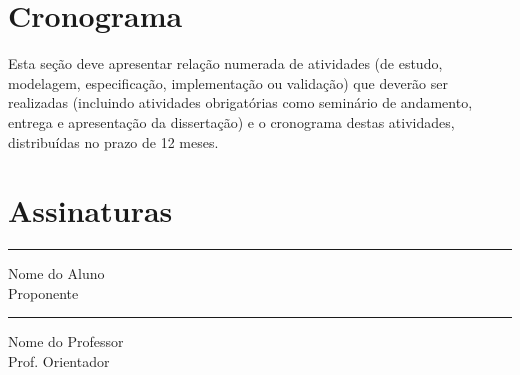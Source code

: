 \documentclass[diss-proposta,nocipinfo]{texufpel}
\begin{document}
\chapter{Cronograma}

Esta seção deve apresentar relação numerada de atividades (de estudo,
modelagem, especificação, implementação ou validação) que deverão ser
realizadas (incluindo atividades obrigatórias como seminário de
andamento, entrega e apresentação da dissertação) e o cronograma
destas atividades, distribuídas no prazo de 12
meses.




\chapter{Assinaturas}
\vspace{2cm}

\begin{center}
\rule{8cm}{.3mm}
\medskip

	Nome do Aluno\\
	Proponente

\end{center}

\vspace{4cm}

\begin{center}
\rule{8cm}{.3mm}
\medskip

	Nome do Professor\\
	Prof. Orientador

\end{center}
\end{document}
